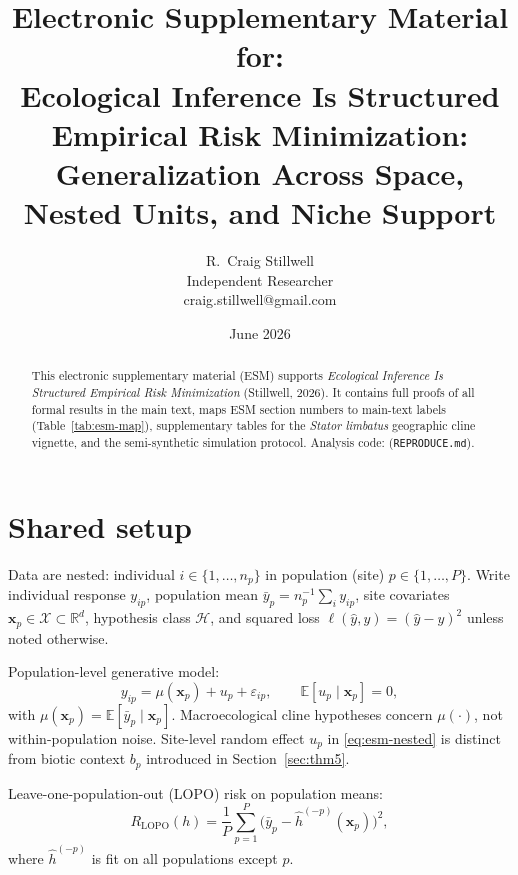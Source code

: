 \documentclass[11pt]{article}
\title{Electronic Supplementary Material for:\\
       Ecological Inference Is Structured Empirical Risk Minimization:\\
       Generalization Across Space, Nested Units, and Niche Support}
\author{R.\ Craig Stillwell\\
        Independent Researcher\\
        craig.stillwell@gmail.com}
\date{June 2026}
\begin{document}
\maketitle

\begin{abstract}
This electronic supplementary material (ESM) supports \emph{Ecological
Inference Is Structured Empirical Risk Minimization} (Stillwell, 2026).
It contains full proofs of all formal results in the main text, maps ESM
section numbers to main-text labels (Table~\ref{tab:esm-map}), supplementary
tables for the \emph{Stator limbatus} geographic cline vignette, and the
semi-synthetic simulation protocol.  Analysis code:
\repoUrl{} (\texttt{REPRODUCE.md}).
\end{abstract}

\tableofcontents

\section{Shared setup}
\label{sec:setup}

Data are nested: individual $i \in \{1,\ldots,n_p\}$ in population
(site) $p \in \{1,\ldots,P\}$.  Write individual response $y_{ip}$,
population mean $\bar{y}_p = n_p^{-1}\sum_i y_{ip}$, site covariates
$\mathbf{x}_p \in \mathcal{X} \subset \mathbb{R}^d$, hypothesis class
$\mathcal{H}$, and squared loss $\ell(\hat{y},y)=(\hat{y}-y)^2$ unless
noted otherwise.

Population-level generative model:
\begin{equation}
  y_{ip} = \mu(\mathbf{x}_p) + u_p + \varepsilon_{ip},
  \qquad \mathbb{E}[u_p \mid \mathbf{x}_p]=0,
  \label{eq:esm-nested}
\end{equation}
with $\mu(\mathbf{x}_p)=\mathbb{E}[\bar{y}_p\mid\mathbf{x}_p]$.
Macroecological cline hypotheses concern $\mu(\cdot)$, not
within-population noise.  Site-level random effect $u_p$ in
\eqref{eq:esm-nested} is distinct from biotic context $b_p$ introduced
in Section~\ref{sec:thm5}.

Leave-one-population-out (LOPO) risk on population means:
\begin{equation}
  R_{\mathrm{LOPO}}(h)
  = \frac{1}{P}\sum_{p=1}^P
    \Big(\bar{y}_p - \hat{h}^{(-p)}(\mathbf{x}_p)\Big)^2,
\end{equation}
where $\hat{h}^{(-p)}$ is fit on all populations except $p$.
\end{document}
